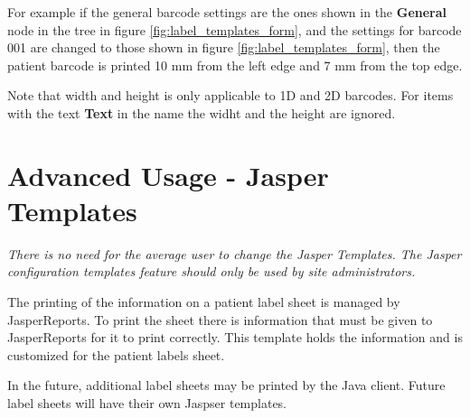 For example if the general barcode settings are the ones shown in the
\textbf{General} node in the tree in figure \ref{fig:label_templates_form}, and
the settings for barcode 001 are changed to those shown in figure
\ref{fig:label_templates_form}, then the patient barcode is printed 10 mm from
the left edge and 7 mm from the top edge.

Note that width and height is only applicable to 1D and 2D barcodes. For items
with the text \textbf{Text} in the name the widht and the height are ignored.

\section{Advanced Usage - Jasper Templates}
\label{sec:jasper_templates}

\emph{There is no need for the average user to change the Jasper
  Templates. The Jasper configuration templates feature should only be used by
site administrators.}

The printing of the information on a patient label sheet is managed by
JasperReports. To print the sheet there is information that must be given to
JasperReports for it to print correctly. This template holds the information and
is customized for the patient labels sheet.

In the future, additional label sheets may be printed by the Java client. Future
label sheets will have their own Jaspser templates.

